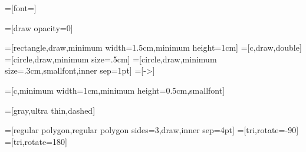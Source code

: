 \usetikzlibrary{calc}

\usetikzlibrary{shapes.geometric}

=[font=\sffamily\footnotesize]

=[draw opacity=0]

=[rectangle,draw,minimum width=1.5cm,minimum height=1cm]
=[c,draw,double]
=[circle,draw,minimum size=.5cm]
=[circle,draw,minimum size=.3cm,smallfont,inner sep=1pt]
=[->]

=[c,minimum width=1cm,minimum height=0.5cm,smallfont]

=[gray,ultra thin,dashed]

=[regular polygon,regular polygon sides=3,draw,inner sep=4pt]
=[tri,rotate=-90]
=[tri,rotate=180]

